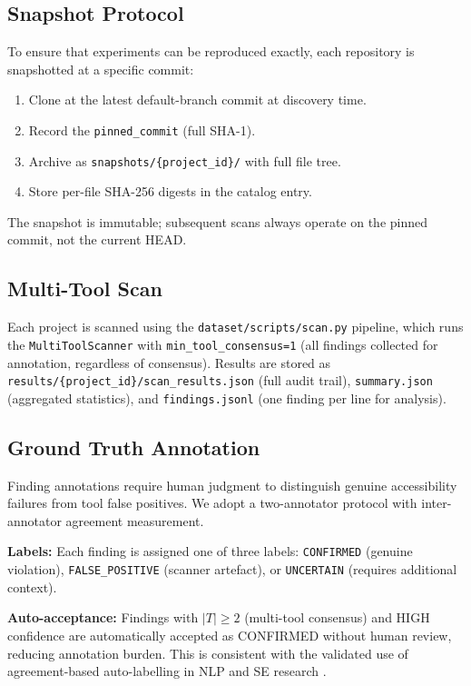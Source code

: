 \documentclass[10pt,conference]{IEEEtran}
\begin{document}
\subsection{Snapshot Protocol}

To ensure that experiments can be reproduced exactly, each repository is
snapshotted at a specific commit:

\begin{enumerate}
  \item Clone at the latest default-branch commit at discovery time.
  \item Record the \texttt{pinned\_commit} (full SHA-1).
  \item Archive as \texttt{snapshots/\{project\_id\}/} with full file tree.
  \item Store per-file SHA-256 digests in the catalog entry.
\end{enumerate}

The snapshot is immutable; subsequent scans always operate on the pinned
commit, not the current HEAD.

\subsection{Multi-Tool Scan}

Each project is scanned using the \texttt{dataset/scripts/scan.py} pipeline,
which runs the \texttt{MultiToolScanner} with \texttt{min\_tool\_consensus=1}
(all findings collected for annotation, regardless of consensus).  Results
are stored as \texttt{results/\{project\_id\}/scan\_results.json} (full audit
trail), \texttt{summary.json} (aggregated statistics), and
\texttt{findings.jsonl} (one finding per line for analysis).

\subsection{Ground Truth Annotation}

Finding annotations require human judgment to distinguish genuine
accessibility failures from tool false positives.  We adopt a two-annotator
protocol with inter-annotator agreement measurement.

\textbf{Labels:} Each finding is assigned one of three labels:
\texttt{CONFIRMED} (genuine violation), \texttt{FALSE\_POSITIVE} (scanner
artefact), or \texttt{UNCERTAIN} (requires additional context).

\textbf{Auto-acceptance:} Findings with $|T| \geq 2$ (multi-tool consensus)
and HIGH confidence are automatically accepted as CONFIRMED without human
review, reducing annotation burden.  This is consistent with the validated
use of agreement-based auto-labelling in NLP and SE research
\cite{snow2008cheap}.
\end{document}

